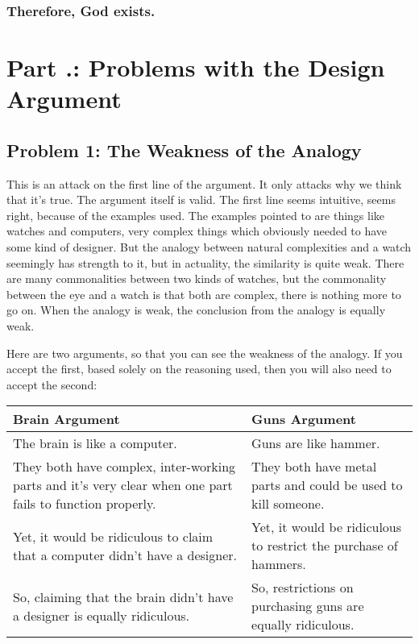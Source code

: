     \subsubsection{Therefore, God exists.} 

\section{Part \thechapcount.\theseccount: Problems with the Design Argument}
\subsection{Problem 1: The Weakness of the Analogy}

This is an attack on the first line of the argument. It only attacks why we think that it’s true. The argument itself is valid. The first line seems intuitive, seems right, because of the examples used. The examples pointed to are things like watches and computers, very complex things which obviously needed to have some kind of designer. But the analogy between natural complexities and a watch seemingly has strength to it, but in actuality, the similarity is quite weak. There are many commonalities between two kinds of watches, but the commonality between the eye and a watch is that both are complex, there is nothing more to go on. When the analogy is weak, the conclusion from the analogy is equally weak.

Here are two arguments, so that you can see the weakness of the analogy. If you accept the first, based solely on the reasoning used, then you will also need to accept the second:


\noindent
\begin{tabular}{p{2.75in}|p{2.75in}}
Brain Argument&Guns Argument\\\hline
    The brain is like a computer.&Guns are like hammer.\\
    They both have complex, inter-working parts and it’s very clear when one part fails to function properly.&They both have metal parts and could be used to kill someone.\\
    Yet, it would be ridiculous to claim that a computer didn’t have a designer.&Yet, it would be ridiculous to restrict the purchase of hammers.\\
    So, claiming that the brain didn’t have a designer is equally ridiculous.&So, restrictions on purchasing guns are equally ridiculous.
\end{tabular}

